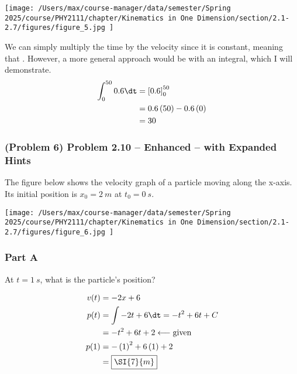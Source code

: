\begin{center}
	\texttt{[image: /Users/max/course-manager/data/semester/Spring 2025/course/PHY2111/chapter/Kinematics in One Dimension/section/2.1-2.7/figures/figure\_5.jpg
	]}
\end{center}

\begin{solution}
	We can simply multiply the time by the velocity since it is constant, meaning that . However, a more general approach would be with an integral, which I will demonstrate.
	\begin{align*}
		\int_{0}^{50} 0.6 \dt &= \left[ 0.6 \right]_{0}^{50} \\
		&= 0.6\left( 50 \right)-0.6\left( 0 \right) \\
		&= 30
	\end{align*}
\end{solution}

\newpage

\subsubsection{(Problem 6) Problem 2.10 -- Enhanced -- with Expanded Hints}

The figure below shows the velocity graph of a particle moving along the x-axis. Its initial position is $x_0 = \SI{2}{m}$ at $t_0 = \SI{0}{s}$.

\begin{center}
	\texttt{[image: /Users/max/course-manager/data/semester/Spring 2025/course/PHY2111/chapter/Kinematics in One Dimension/section/2.1-2.7/figures/figure\_6.jpg
	]}
\end{center}

\subsubsection{Part A}
At $t=\SI{1}{s}$, what is the particle's position?

\begin{solution}
	\begin{align*}
		v(t) &= -2x + 6 \\
		p(t) &= \int -2t + 6 \dt = -t^2 + 6t + C \\
		&= -t^2 + 6t + 2 \longleftarrow \text{given} \\
		p(1) &= -\left( 1 \right)^2 + 6\left( 1 \right) + 2 \\
		&= \boxed{\SI{7}{m}}
	\end{align*}
\end{solution}

